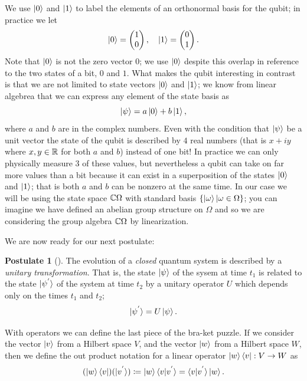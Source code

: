 \documentclass[12pt,twoside]{reedthesis}
\theoremstyle{plain}   %
\theoremstyle{definition}
\newtheorem{post}{Postulate}[section]
\theoremstyle{remark}
\numberwithin{equation}{section}
\begin{document}
  We use $\ket{0}$ and $\ket{1}$ to label the elements of an orthonormal basis for the qubit; in practice we let
  \[\ket{0} =
    \begin{pmatrix}
      1 \\
      0
    \end{pmatrix},
    \quad
    \ket{1} =
    \begin{pmatrix}
      0 \\
      1
    \end{pmatrix}.
  \]
  Note that $\ket{0}$ is not the zero vector $0$; we use $\ket{0}$ despite this overlap in reference to the two states of a bit, $0$ and $1$.
  What makes the qubit interesting in contrast is that we are not limited to state vectors $\ket{0}$ and $\ket{1}$; we know from linear algebrea that
  we can express any element of the state basis as
  \[\ket{\psi} = a \ket{0} + b \ket{1}, \]
  where $a$ and $b$ are in the complex numbers. Even with the condition that $\ket{\psi}$ be a unit vector
  the state of the qubit is described by $4$ real numbers (that is $x +iy$ where $x,y \in \mathbb{R}$ for both $a$ and $b$) instead of one bit! In practice we can only physically measure $3$ of these values,
  but nevertheless a qubit can take on far more values than a bit because it can exist in a superposition of the states $\ket{0}$ and $\ket{1}$; that is both $a$ and $b$ can be nonzero at the same time.
  In our case we will be using the state space $\mathbb{C} \Omega$ with standard basis $\{ \ket{\omega} | \omega \in \Omega\}$; you can imagine we have defined an abelian group structure on $\Omega$ and so we are
  considering the group algebra $\mathbb{C} \Omega$ by linearization. \par
  We are now ready for our next postulate:
  \begin{post}[{\cite[2.2.2]{nielsen2010}}]
    The evolution of a \emph{closed} quantum system is described by a \emph{unitary transformation}. That is, the state $\ket{\psi}$ of the sysem at time $t_1$ is related to the state
    $\ket{ \psi^{'} }$ of the system at time $t_2$ by a unitary operator $U$ which depends only on the times $t_1$ and $t_2$;
    \[ \ket{\psi^{'}} = U \ket{\psi}.\]
  \end{post}
  With operators we can define the last piece of the bra-ket puzzle. If we consider the vector $\ket{v}$ from a Hilbert space $V$, and the vector $\ket{w}$ from a Hilbert space $W$,
  then we define the out product notation for a linear operator $\ket{w} \bra{v} : V \to W$ as
  \[ (\ket{w} \bra{v}) (\ket{v^{'}}) \coloneq \ket{w} \braket{v|v^{'}} = \braket{v|v^{'}} \ket{w}.\]
\end{document}
